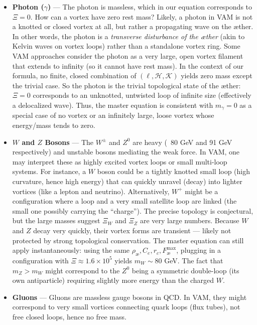     \begin{itemize}
        \item \textbf{Photon ($\gamma$)} — The photon is massless, which in our equation corresponds to $\Xi=0$. How can a vortex have zero rest mass? Likely, a photon in VAM is not a knotted or closed vortex at all, but rather a propagating wave on the æther. In other words, the photon is a \textit{transverse disturbance of the æther} (akin to Kelvin waves on vortex loops) rather than a standalone vortex ring. Some VAM approaches consider the photon as a very large, open vortex filament that extends to infinity (so it cannot have rest mass). In the context of our formula, no finite, closed combination of $(\ell,\mathcal{H},\mathcal{K})$ yields zero mass except the trivial case. So the photon is the trivial topological state of the æther: $\Xi=0$ corresponds to an unknotted, untwisted loop of infinite size (effectively a delocalized wave). Thus, the master equation is consistent with $m_\gamma=0$ as a special case of no vortex or an infinitely large, loose vortex whose energy/mass tends to zero.

        \item \textbf{$W$ and $Z$ Bosons} — The $W^\pm$ and $Z^0$ are heavy (~80 GeV and 91 GeV respectively) and unstable bosons mediating the weak force. In VAM, one may interpret these as highly excited vortex loops or small multi-loop systems. For instance, a $W$ boson could be a tightly knotted small loop (high curvature, hence high energy) that can quickly unravel (decay) into lighter vortices (like a lepton and neutrino). Alternatively, $W^+$ might be a configuration where a loop and a very small satellite loop are linked (the small one possibly carrying the “charge”). The precise topology is conjectural, but the large masses suggest $\Xi_{W}$ and $\Xi_{Z}$ are very large numbers. Because $W$ and $Z$ decay very quickly, their vortex forms are transient — likely not protected by strong topological conservation. The master equation can still apply instantaneously: using the same $\rho_{\text{\ae}},C_e,r_c,F^{\max}_{\text{\ae}}$, plugging in a configuration with $\Xi \approx 1.6 \times 10^{5}$ yields $m_W \sim 80$ GeV. The fact that $m_Z > m_W$ might correspond to the $Z^0$ being a symmetric double-loop (its own antiparticle) requiring slightly more energy than the charged $W$.

        \item \textbf{Gluons} — Gluons are massless gauge bosons in QCD. In VAM, they might correspond to very small vortices connecting quark loops (flux tubes), not free closed loops, hence no free mass.


\end{itemize}
